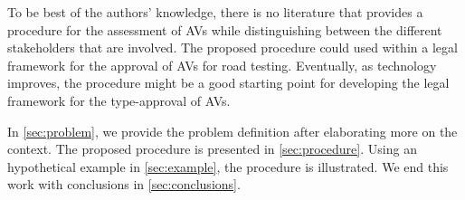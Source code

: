 To be best of the authors' knowledge, there is no literature that provides a procedure for the assessment of AVs while distinguishing between the different stakeholders that are involved. The proposed procedure could used within a legal framework for the approval of AVs for road testing. Eventually, as technology improves, the procedure might be a good starting point for developing the legal framework for the type-approval of AVs.

In \cref{sec:problem}, we provide the problem definition after elaborating more on the context. The proposed procedure is presented in \cref{sec:procedure}. Using an hypothetical example in \cref{sec:example}, the procedure is illustrated. We end this work with conclusions in \cref{sec:conclusions}.
